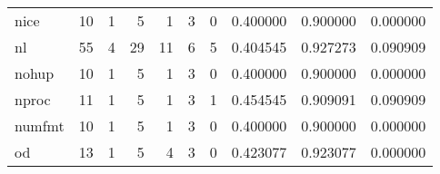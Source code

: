 \begin{longtable}{lrrrrrrrrr}
nice      &                                       10 &                                                  1 &                                                  5 &                                                  1 &                                                  3 &                                                  0 &                                           0.400000 &                               0.900000 &                             0.000000 \\
nl        &                                       55 &                                                  4 &                                                 29 &                                                 11 &                                                  6 &                                                  5 &                                           0.404545 &                               0.927273 &                             0.090909 \\
nohup     &                                       10 &                                                  1 &                                                  5 &                                                  1 &                                                  3 &                                                  0 &                                           0.400000 &                               0.900000 &                             0.000000 \\
nproc     &                                       11 &                                                  1 &                                                  5 &                                                  1 &                                                  3 &                                                  1 &                                           0.454545 &                               0.909091 &                             0.090909 \\
numfmt    &                                       10 &                                                  1 &                                                  5 &                                                  1 &                                                  3 &                                                  0 &                                           0.400000 &                               0.900000 &                             0.000000 \\
od        &                                       13 &                                                  1 &                                                  5 &                                                  4 &                                                  3 &                                                  0 &                                           0.423077 &                               0.923077 &                             0.000000 \\

\end{longtable}
